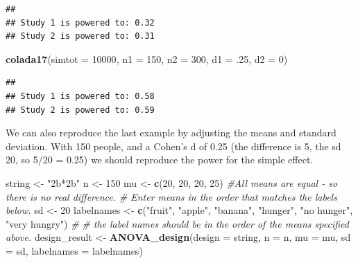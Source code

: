 \documentclass[]{book}
\newenvironment{Shaded}{\begin{snugshade}}{\end{snugshade}}
\newcommand{\CommentTok}[1]{\textcolor[rgb]{0.56,0.35,0.01}{\textit{#1}}}
\newcommand{\DataTypeTok}[1]{\textcolor[rgb]{0.13,0.29,0.53}{#1}}
\newcommand{\DecValTok}[1]{\textcolor[rgb]{0.00,0.00,0.81}{#1}}
\newcommand{\FloatTok}[1]{\textcolor[rgb]{0.00,0.00,0.81}{#1}}
\newcommand{\KeywordTok}[1]{\textcolor[rgb]{0.13,0.29,0.53}{\textbf{#1}}}
\newcommand{\NormalTok}[1]{#1}
\newcommand{\StringTok}[1]{\textcolor[rgb]{0.31,0.60,0.02}{#1}}
\begin{document}
\begin{verbatim}
## 
## Study 1 is powered to: 0.32
## Study 2 is powered to: 0.31
\end{verbatim}

\begin{Shaded}
\begin{Highlighting}[]
\KeywordTok{colada17}\NormalTok{(}\DataTypeTok{simtot =} \DecValTok{10000}\NormalTok{, }\DataTypeTok{n1 =} \DecValTok{150}\NormalTok{, }\DataTypeTok{n2 =} \DecValTok{300}\NormalTok{, }\DataTypeTok{d1 =} \FloatTok{.25}\NormalTok{, }\DataTypeTok{d2 =} \DecValTok{0}\NormalTok{)}
\end{Highlighting}
\end{Shaded}

\begin{verbatim}
## 
## Study 1 is powered to: 0.58
## Study 2 is powered to: 0.59
\end{verbatim}

We can also reproduce the last example by adjusting the means and standard deviation. With 150 people, and a Cohen's d of 0.25 (the difference is 5, the sd 20, so 5/20 = 0.25) we should reproduce the power for the simple effect.

\begin{Shaded}
\begin{Highlighting}[]
\NormalTok{string <-}\StringTok{ "2b*2b"}
\NormalTok{n <-}\StringTok{ }\DecValTok{150}
\NormalTok{mu <-}\StringTok{ }\KeywordTok{c}\NormalTok{(}\DecValTok{20}\NormalTok{, }\DecValTok{20}\NormalTok{, }\DecValTok{20}\NormalTok{, }\DecValTok{25}\NormalTok{) }\CommentTok{#All means are equal - so there is no real difference.}
\CommentTok{# Enter means in the order that matches the labels below.}
\NormalTok{sd <-}\StringTok{ }\DecValTok{20}
\NormalTok{labelnames <-}\StringTok{ }\KeywordTok{c}\NormalTok{(}\StringTok{"fruit"}\NormalTok{, }\StringTok{"apple"}\NormalTok{, }\StringTok{"banana"}\NormalTok{, }\StringTok{"hunger"}\NormalTok{, }\StringTok{"no hunger"}\NormalTok{, }\StringTok{"very hungry"}\NormalTok{) }\CommentTok{#}
\CommentTok{# the label names should be in the order of the means specified above.}
\NormalTok{design_result <-}\StringTok{ }\KeywordTok{ANOVA_design}\NormalTok{(}\DataTypeTok{design =}\NormalTok{ string,}
                   \DataTypeTok{n =}\NormalTok{ n, }
                   \DataTypeTok{mu =}\NormalTok{ mu, }
                   \DataTypeTok{sd =}\NormalTok{ sd, }
                   \DataTypeTok{labelnames =}\NormalTok{ labelnames)}
\end{Highlighting}
\end{Shaded}
\end{document}
